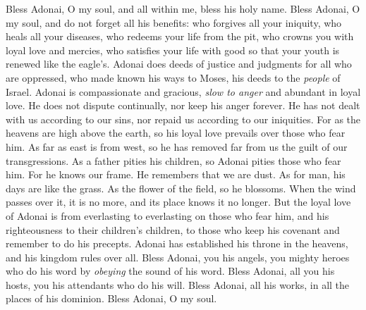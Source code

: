 \begin{biblechapter} %
 Bless Adonai, O my soul, 
and all within me, bless his holy name.
\verse Bless Adonai, O my soul, 
and do not forget all his benefits:
\verse who forgives all your iniquity, 
who heals all your diseases,
\verse who redeems your life from the pit, 
who crowns you with loyal love and mercies,
\verse who satisfies your life with good 
so that your youth is renewed like the eagle’s.
\verse Adonai does deeds of justice 
and judgments for all who are oppressed,
\verse who made known his ways to Moses, 
his deeds to the \textit{people} of Israel.
\verse Adonai is compassionate and gracious, 
\textit{slow to anger} and abundant in loyal love.
\verse He does not dispute continually, 
nor keep his anger forever.
\verse He has not dealt with us according to our sins, 
nor repaid us according to our iniquities.
\verse For as the heavens are high above the earth, 
so his loyal love prevails over those who fear him.
\verse As far as east is from west, 
so he has removed far from us the guilt of our transgressions.
\verse As a father pities his children, 
so Adonai pities those who fear him.
\verse For he knows our frame. 
He remembers that we are dust.
\verse As for man, his days are like the grass. 
As the flower of the field, so he blossoms.
\verse When the wind passes over it, it is no more, 
and its place knows it no longer.
\verse But the loyal love of Adonai 
is from everlasting to everlasting on those who fear him, 
and his righteousness to their children’s children,
\verse to those who keep his covenant 
and remember to do his precepts.
\verse Adonai has established his throne in the heavens, 
and his kingdom rules over all.
\verse Bless Adonai, you his angels, 
you mighty heroes who do his word 
by \textit{obeying} the sound of his word.
\verse Bless Adonai, all you his hosts, 
you his attendants who do his will.
\verse Bless Adonai, all his works, 
in all the places of his dominion. 
Bless Adonai, O my soul.
\end{biblechapter}

